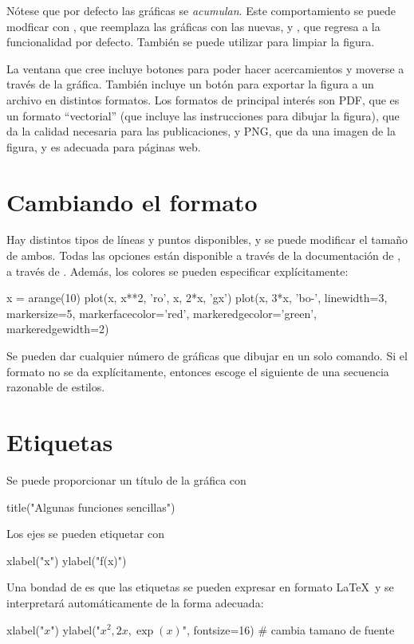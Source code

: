 Nótese que por defecto las gráficas se \emph{acumulan}. Este comportamiento se puede modficar con , que reemplaza las gráficas con las nuevas, y , que regresa a la funcionalidad por defecto.  También se puede utilizar  para limpiar la figura.




La ventana que cree  incluye botones para poder hacer acercamientos y moverse a través de la gráfica.
También incluye un botón para exportar la figura a un archivo en distintos formatos. Los formatos de principal interés son PDF, que es un formato ``vectorial'' (que incluye las instrucciones para dibujar la figura), que da la calidad necesaria para las publicaciones, y PNG, que da una imagen de la figura, y es adecuada para páginas web.

\section{Cambiando el formato}

Hay distintos tipos de líneas y puntos disponibles, y se puede modificar el tamaño de ambos. Todas las opciones están disponible a través de la documentación de , a través de . Además, los colores se pueden especificar explícitamente:
\begin{python}
x = arange(10)
plot(x, x**2, 'ro', x, 2*x, 'gx')
plot(x, 3*x, 'bo-', linewidth=3, markersize=5, markerfacecolor='red', markeredgecolor='green', markeredgewidth=2)
\end{python}
Se pueden dar cualquier número de gráficas que dibujar en un solo comando. Si el formato no se da explícitamente, entonces  escoge el siguiente de una secuencia razonable de estilos.

\section{Etiquetas}

Se puede proporcionar un título de la gráfica con 
\begin{python}
title("Algunas funciones sencillas")
\end{python}


Los ejes se pueden etiquetar con 
\begin{python}
xlabel("x")
ylabel("f(x)")
\end{python}
Una bondad de  es que las etiquetas se pueden expresar en formato \LaTeX\ y se interpretará automáticamente de la forma adecuada:
\begin{python}
xlabel("$x$")
ylabel("$x^2, 2x, \exp(x)$", fontsize=16)	# cambia tamano de fuente 
\end{python}

